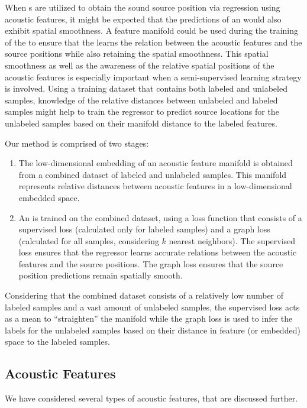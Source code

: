 \documentclass[applsci,article,submit,moreauthors,pdftex]{Definitions/mdpi}
\begin{document}
When \ann{}s are utilized to obtain the sound source position via regression using acoustic features, it might be expected that the predictions of an \ann{} would also exhibit spatial smoothness. A feature manifold could be used during the training of the \ann{} to ensure that the \ann{} learns the relation between the acoustic features and the source positions while also retaining the spatial smoothness.
This spatial smoothness as well as the awareness of the relative spatial positions of the acoustic features is especially important when a semi-supervised learning strategy is involved. Using a training dataset that contains both labeled and unlabeled samples, knowledge of the relative distances between unlabeled and labeled samples might help to train the regressor to predict source locations for the unlabeled samples based on their manifold distance to the labeled features.


Our method is comprised of two stages:
\begin{enumerate}
	\item The low-dimensional embedding of an acoustic feature manifold is obtained from a combined dataset of labeled and unlabeled samples. This manifold represents relative distances between acoustic features in a low-dimensional embedded space.
	\item An \ann{} is trained on the combined dataset, using a loss function that consists of a supervised loss (calculated only for labeled samples) and a graph loss (calculated for all samples, considering $ k $ nearest neighbors). The supervised loss ensures that the regressor learns accurate relations between the acoustic features and the source positions. The graph loss ensures that the source position predictions remain spatially smooth.
\end{enumerate}

Considering that the combined dataset consists of a relatively low number of labeled samples and a vast amount of unlabeled samples, the supervised loss acts as a mean to ``straighten'' the manifold while the graph loss is used to infer the labels for the unlabeled samples based on their distance in feature (or embedded) space to the labeled samples.


\subsection{Acoustic Features}
We have considered several types of acoustic features, that are discussed further.
\end{document}

